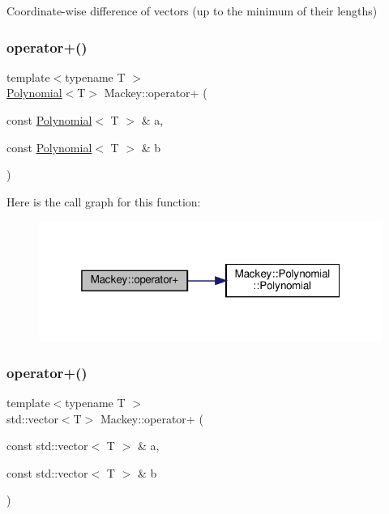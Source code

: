 Coordinate-\/wise difference of vectors (up to the minimum of their lengths) 

\mbox{\label{namespaceMackey_a61f8cf9c3cf22acfedda5f427423f6c4}} 
\subsubsection{\texorpdfstring{operator+()}{operator+()}\hspace{0.1cm}{\footnotesize\ttfamily [1/3]}}
{\footnotesize\ttfamily template$<$typename T $>$ \\
\hyperlink{classMackey_1_1Polynomial}{Polynomial}$<$T$>$ Mackey\+::operator+ (\begin{DoxyParamCaption}\item[{const \hyperlink{classMackey_1_1Polynomial}{Polynomial}$<$ T $>$ \&}]{a,  }\item[{const \hyperlink{classMackey_1_1Polynomial}{Polynomial}$<$ T $>$ \&}]{b }\end{DoxyParamCaption})}

Here is the call graph for this function\+:\nopagebreak
\begin{figure}[H]
\begin{center}
\leavevmode
\includegraphics[width=319pt]{namespaceMackey_a61f8cf9c3cf22acfedda5f427423f6c4_cgraph}
\end{center}
\end{figure}
\mbox{\label{namespaceMackey_adb4974b5ffe533abb955ccb6b9096155}} 
\subsubsection{\texorpdfstring{operator+()}{operator+()}\hspace{0.1cm}{\footnotesize\ttfamily [2/3]}}
{\footnotesize\ttfamily template$<$typename T $>$ \\
std\+::vector$<$T$>$ Mackey\+::operator+ (\begin{DoxyParamCaption}\item[{const std\+::vector$<$ T $>$ \&}]{a,  }\item[{const std\+::vector$<$ T $>$ \&}]{b }\end{DoxyParamCaption})}



